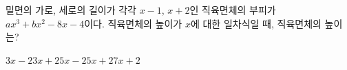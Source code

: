 밑면의 가로, 세로의 길이가 각각 $x-1$, $x+2$인 직육면체의 부피가 $ax^3+bx^2-8x-4$이다. 직육면체의 높이가 $x$에 대한 일차식일 때, 직육면체의 높이는? 
\begin{choices32}{$3x-2$}{$3x+2$}{$5x-2$}{$5x+2$}{$7x+2$}\end{choices32}
